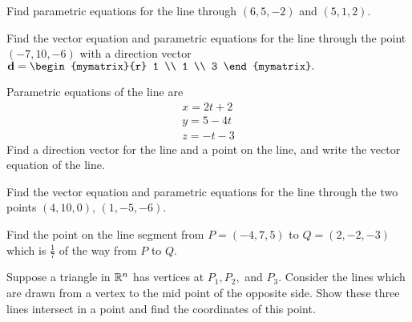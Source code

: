 \begin{enumialphparenastyle}
\begin{ex} Find parametric equations for the line through $\left( 6 , 5 , -2 \right) $ 
and $\left(5 , 1 , 2 \right) .$ 
\end{ex} 
 

\begin{ex} Find the vector equation and parametric equations for the line through the point $\left(
-7, 10 , -6 \right) $ with a direction vector $\vect{d} = \begin{mymatrix}{r}
1 \\
1 \\
3
\end{mymatrix} .$ \vspace{1mm}
\end{ex} 

\begin{ex} Parametric equations of the line are 
\begin{equation*}
\begin{array}{c}
x = 2t+2\\
y = 5-4t\\
z= -t-3
\end{array}
\end{equation*}
 Find a direction vector for the line and a point on the line, and write the 
vector equation of the line. 
\end{ex} 


\begin{ex} Find the vector equation and parametric equations for the line through the two points $\left(
4, 10, 0 \right) $, $\left( 1 , -5 , -6 \right) .$ 
\end{ex} 

\begin{ex} Find the point on the line segment from $P = \left(-4, 7, 5 \right) $
 to $Q = \left(2 , -2 , -3 \right) $ which is $\frac{1}{7}$ of the way from $P$ to $Q$.
\end{ex} 

\begin{ex} Suppose a triangle in $\mathbb{R}^{n}$  has vertices at $P_{1}, P_{2},$ and $P_{3}$. 
Consider the lines which are
drawn from a vertex to the mid point of the opposite side. Show these three
lines intersect in a point and find the coordinates of this point. 
\end{ex} 

\end{enumialphparenastyle}